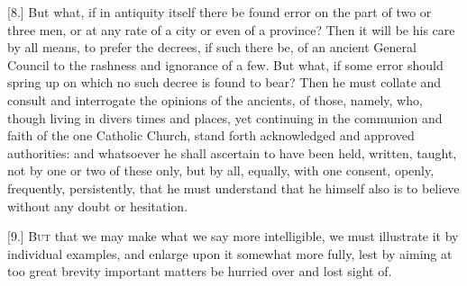 [8.] But what, if in antiquity itself there be found error on the part of two or three men, or at any rate of a city or even of a province? Then it will be his care by all means, to prefer the decrees, if such there be, of an ancient General Council to the rashness and ignorance of a few. But what, if some error should spring up on which no such decree is found to bear? Then he must collate and consult and interrogate the opinions of the ancients, of those, namely, who, though living in divers times and places, yet continuing in the communion and faith of the one Catholic Church, stand forth acknowledged and approved authorities: and whatsoever he shall ascertain to have been held, written, taught, not by one or two of these only, but by all, equally, with one consent, openly, frequently, persistently, that he must understand that he himself also is to believe without any doubt or hesitation.


[9.] \textsc{But} that we may make what we say more intelligible, we must illustrate it by individual examples, and enlarge upon it somewhat more fully, lest by aiming at too great brevity important matters be hurried over and lost sight of.

